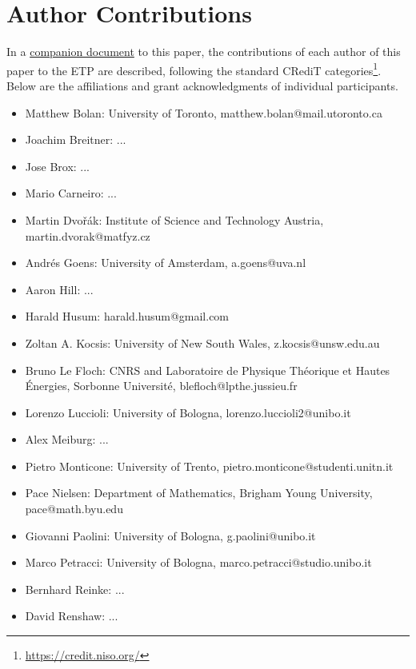 \section{Author Contributions}

In a \href{https://github.com/teorth/equational_theories/blob/main/paper/contributions.md}{companion document} to this paper, the contributions of each author of this paper to the ETP are described, following the standard CRediT categories\footnote{\url{https://credit.niso.org/}}.  Below are the affiliations and grant acknowledgments of individual participants.  


\begin{itemize}
    \item Matthew Bolan: University of Toronto, matthew.bolan@mail.utoronto.ca
    \item Joachim Breitner: ...
    \item Jose Brox: ...
    \item Mario Carneiro: ...
    \item Martin Dvo\v{r}\'ak: Institute of Science and Technology Austria, martin.dvorak@matfyz.cz
    \item Andr\'es Goens: University of Amsterdam, a.goens@uva.nl
    \item Aaron Hill: ...
    \item Harald Husum: harald.husum@gmail.com
    \item Zoltan A. Kocsis: University of New South Wales, z.kocsis@unsw.edu.au
    \item Bruno Le Floch: CNRS and Laboratoire de Physique Th\'eorique et Hautes \'Energies, Sorbonne Universit\'e, blefloch@lpthe.jussieu.fr
    \item Lorenzo Luccioli: University of Bologna, lorenzo.luccioli2@unibo.it
    \item Alex Meiburg: ...
    \item Pietro Monticone: University of Trento, pietro.monticone@studenti.unitn.it
    \item Pace Nielsen: Department of Mathematics, Brigham Young University, pace@math.byu.edu
    \item Giovanni Paolini: University of Bologna, g.paolini@unibo.it
    \item Marco Petracci: University of Bologna, marco.petracci@studio.unibo.it
    \item Bernhard Reinke: ...
    \item David Renshaw: ...

\end{itemize}
